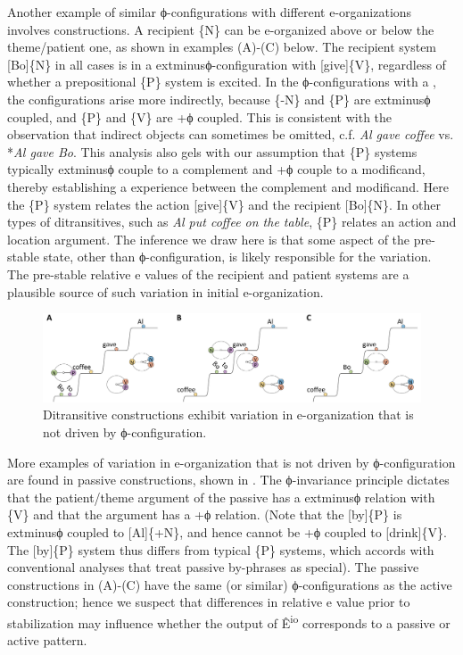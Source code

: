   Another example of similar ϕ-con\-fig\-u\-ra\-tions with different e-organizations involves  constructions. A recipient \{N\} can be e-organized above or below the theme/patient one, as shown in examples (A)-(C) below. The recipient system [Bo]\{N\} in all cases is in a 	extminus{}ϕ-con\-fig\-u\-ra\-tion with [give]\{V\}, regardless of whether a prepositional \{P\} system is excited. In the ϕ-con\-fig\-u\-ra\-tions with a , the configurations arise more indirectly, because \{-N\} and \{P\} are 	extminus{}ϕ coupled, and \{P\} and \{V\} are +ϕ coupled. This is consistent with the observation that indirect objects can sometimes be omitted, c.f. \textit{Al gave coffee} vs. *\textit{Al gave Bo}. This analysis also gels with our assumption that \{P\} systems typically 	extminus{}ϕ couple to a complement and +ϕ couple to a modificand, thereby establishing a  experience between the complement and modificand. Here the \{P\} system relates the action [give]\{V\} and the recipient [Bo]\{N\}. In other types of ditransitives, such as \textit{Al put coffee on the table}, \{P\} relates an action and location argument. The inference we draw here is that some aspect of the pre-stable state, other than ϕ-con\-fig\-u\-ra\-tion, is likely responsible for the variation. The pre-stable relative e values of the recipient and patient systems are a plausible source of such variation in initial e-organization.

  
\begin{figure}
\includegraphics[width=\textwidth]{figures/Tilsen-img80.png}
\caption{Ditransitive constructions exhibit variation in e-organization that is not driven by ϕ-con\-fig\-u\-ra\-tion.}
\label{fig:4:30}
\end{figure}
 

  More examples of variation in e-organization that is not driven by ϕ-con\-fig\-u\-ra\-tion are found in passive constructions, shown in {}. The ϕ-invariance principle dictates that the patient/theme argument of the passive has a 	extminus{}ϕ relation with \{V\} and that the  argument has a +ϕ relation. (Note that the  [by]\{P\} is 	extminus{}ϕ coupled to [Al]\{+N\}, and hence cannot be +ϕ coupled to [drink]\{V\}. The [by]\{P\} system thus differs from typical \{P\} systems, which accords with conventional analyses that treat passive by-phrases as special). The passive constructions in {}(A)-(C) have the same (or similar) ϕ-con\-fig\-u\-ra\-tions as the active construction; hence we suspect that differences in relative e value prior to stabilization may influence whether the output of Ê\textsuperscript{io} corresponds to a passive or active pattern.

